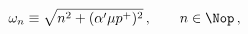 \begin{equation}
\omega_n\equiv\sqrt{n^2+(\alpha^\prime\mu p^+)^2}\,,\qquad n\in\Nop\,,
\end{equation}

